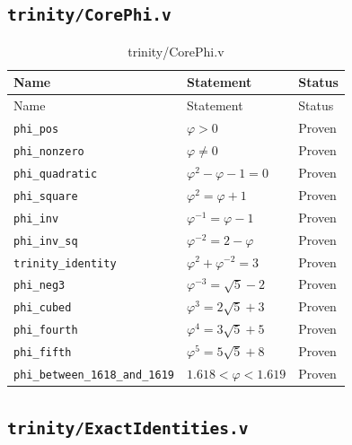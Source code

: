 \subsection{\texttt{trinity/CorePhi.v}}
\label{sec:A-coq-corephi}

\begin{longtable}{lll}
\toprule
Name & Statement & Status \\
\midrule
\endfirsthead
\toprule
Name & Statement & Status \\
\midrule
\endhead
\bottomrule
\endfoot
\bottomrule
\caption{trinity/CorePhi.v}
\endlastfoot
\texttt{phi\_pos} & $\varphi>0$ & Proven \\
\texttt{phi\_nonzero} & $\varphi\neq 0$ & Proven \\
\texttt{phi\_quadratic} & $\varphi^{2}-\varphi-1=0$ & Proven \\
\texttt{phi\_square} & $\varphi^{2}=\varphi+1$ & Proven \\
\texttt{phi\_inv} & $\varphi^{-1}=\varphi-1$ & Proven \\
\texttt{phi\_inv\_sq} & $\varphi^{-2}=2-\varphi$ & Proven \\
\texttt{trinity\_identity} & $\varphi^{2}+\varphi^{-2}=3$ & Proven \\
\texttt{phi\_neg3} & $\varphi^{-3}=\sqrt{5}-2$ & Proven \\
\texttt{phi\_cubed} & $\varphi^{3}=2\sqrt{5}+3$ & Proven \\
\texttt{phi\_fourth} & $\varphi^{4}=3\sqrt{5}+5$ & Proven \\
\texttt{phi\_fifth} & $\varphi^{5}=5\sqrt{5}+8$ & Proven \\
\texttt{phi\_between\_1618\_and\_1619} &
  $1.618 < \varphi < 1.619$ & Proven \\
\end{longtable}

\subsection{\texttt{trinity/ExactIdentities.v}}
\label{sec:A-coq-exact}

